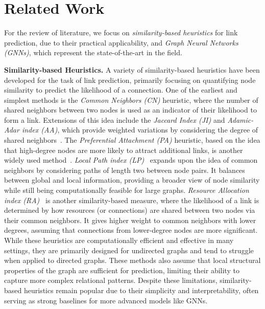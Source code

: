 \section{Related Work}
\label{sec:literature}
For the review of literature, we focus on \emph{similarity-based heuristics} for link prediction, due to their practical applicability, and \emph{Graph Neural Networks (GNNs)}, which represent the state-of-the-art in the field. 

\textbf{Similarity-based Heuristics.} A variety of similarity-based heuristics have been developed for the task of link prediction, primarily focusing on quantifying node similarity to predict the likelihood of a connection. One of the earliest and simplest methods is the \emph{Common Neighbors (CN)} heuristic, where the number of shared neighbors between two nodes is used as an indicator of their likelihood to form a link. Extensions of this idea include the \emph{Jaccard Index (JI)} and \emph{Adamic-Adar index (AA)}, which provide weighted variations by considering the degree of shared neighbors~\cite{adamic2003friends, liben2007link}. The \emph{Preferential Attachment (PA)} heuristic, based on the idea that high-degree nodes are more likely to attract additional links, is another widely used method~\cite{newman2001clustering}. \emph{Local Path index (LP)}~\citep{lu2009similarity} expands upon the idea of common neighbors by considering paths of length two between node pairs. It balances between global and local information, providing a broader view of node similarity while still being computationally feasible for large graphs. \emph{Resource Allocation index (RA)}~\citep{zhou2009predicting} is another similarity-based measure, where the likelihood of a link is determined by how resources (or connections) are shared between two nodes via their common neighbors. It gives higher weight to common neighbors with lower degrees, assuming that connections from lower-degree nodes are more significant. While these heuristics are computationally efficient and effective in many settings, they are primarily designed for undirected graphs and tend to struggle when applied to directed graphs. These methods also assume that local structural properties of the graph are sufficient for prediction, limiting their ability to capture more complex relational patterns. Despite these limitations, similarity-based heuristics remain popular due to their simplicity and interpretability, often serving as strong baselines for more advanced models like GNNs. 

